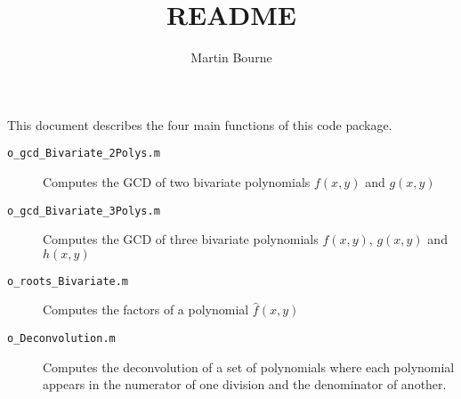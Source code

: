 \documentclass{article}
\title{README}
\author{Martin Bourne}
\begin{document}
\maketitle

This document describes the four main functions of this code package.
\begin{description}
	\item[\texttt{o\_gcd\_Bivariate\_2Polys.m}] Computes the \gls{GCD} of two bivariate polynomials $f(x,y)$ and $g(x,y)$

	\item[\texttt{o\_gcd\_Bivariate\_3Polys.m}] Computes the \gls{GCD} of three bivariate polynomials $f(x,y)$, $g(x,y)$ and $h(x,y)$

	\item[\texttt{o\_roots\_Bivariate.m}] Computes the factors of a polynomial $\hat{f}(x,y)$
	
	\item[\texttt{o\_Deconvolution.m}] Computes the deconvolution of a set of polynomials where each polynomial appears in the numerator of one division and the denominator of another.
	
\end{description}

\begin{description}
	\item 
\end{description}
\end{document}
